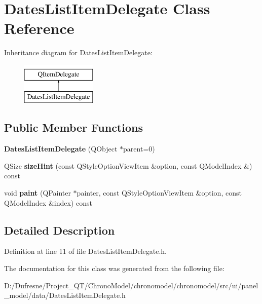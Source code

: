 \hypertarget{class_dates_list_item_delegate}{\section{Dates\-List\-Item\-Delegate Class Reference}
\label{class_dates_list_item_delegate}
}
Inheritance diagram for Dates\-List\-Item\-Delegate\-:\begin{figure}[H]
\begin{center}
\leavevmode
\includegraphics[height=2.000000cm]{class_dates_list_item_delegate}
\end{center}
\end{figure}
\subsection*{Public Member Functions}
\begin{DoxyCompactItemize}
\item 
\hypertarget{class_dates_list_item_delegate_a2d31746e87fa5423005644273b617787}{{\bfseries Dates\-List\-Item\-Delegate} (Q\-Object $\ast$parent=0)}\label{class_dates_list_item_delegate_a2d31746e87fa5423005644273b617787}

\item 
\hypertarget{class_dates_list_item_delegate_a26f89bf9b7ea79f2c35d6c9ddf902cc1}{Q\-Size {\bfseries size\-Hint} (const Q\-Style\-Option\-View\-Item \&option, const Q\-Model\-Index \&) const }\label{class_dates_list_item_delegate_a26f89bf9b7ea79f2c35d6c9ddf902cc1}

\item 
\hypertarget{class_dates_list_item_delegate_a9d5c94a5897ba85339017f8bf41947b6}{void {\bfseries paint} (Q\-Painter $\ast$painter, const Q\-Style\-Option\-View\-Item \&option, const Q\-Model\-Index \&index) const }\label{class_dates_list_item_delegate_a9d5c94a5897ba85339017f8bf41947b6}

\end{DoxyCompactItemize}


\subsection{Detailed Description}


Definition at line 11 of file Dates\-List\-Item\-Delegate.\-h.



The documentation for this class was generated from the following file\-:\begin{DoxyCompactItemize}
\item 
D\-:/\-Dufresne/\-Project\-\_\-\-Q\-T/\-Chrono\-Model/chronomodel/chronomodel/src/ui/panel\-\_\-model/data/Dates\-List\-Item\-Delegate.\-h\end{DoxyCompactItemize}
